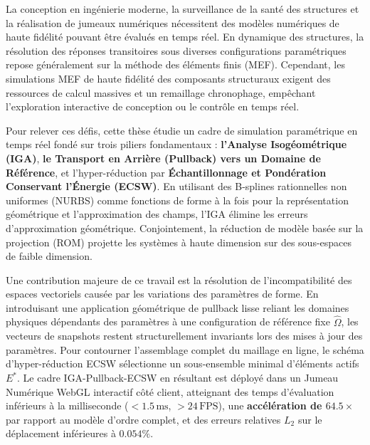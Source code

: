 La conception en ingénierie moderne, la surveillance de la santé des structures et la réalisation de jumeaux numériques nécessitent des modèles numériques de haute fidélité pouvant être évalués en temps réel. En dynamique des structures, la résolution des réponses transitoires sous diverses configurations paramétriques repose généralement sur la méthode des éléments finis (MEF). Cependant, les simulations MEF de haute fidélité des composants structuraux exigent des ressources de calcul massives et un remaillage chronophage, empêchant l'exploration interactive de conception ou le contrôle en temps réel.

Pour relever ces défis, cette thèse étudie un cadre de simulation paramétrique en temps réel fondé sur trois piliers fondamentaux : \textbf{l'Analyse Isogéométrique (IGA)}, \textbf{le Transport en Arrière (Pullback) vers un Domaine de Référence}, et l'hyper-réduction par \textbf{Échantillonnage et Pondération Conservant l'Énergie (ECSW)}. En utilisant des B-splines rationnelles non uniformes (NURBS) comme fonctions de forme à la fois pour la représentation géométrique et l'approximation des champs, l'IGA élimine les erreurs d'approximation géométrique. Conjointement, la réduction de modèle basée sur la projection (ROM) projette les systèmes à haute dimension sur des sous-espaces de faible dimension.

Une contribution majeure de ce travail est la résolution de l'incompatibilité des espaces vectoriels causée par les variations des paramètres de forme. En introduisant une application géométrique de pullback lisse reliant les domaines physiques dépendants des paramètres à une configuration de référence fixe $\hat{\Omega}$, les vecteurs de snapshots restent structurellement invariants lors des mises à jour des paramètres. Pour contourner l'assemblage complet du maillage en ligne, le schéma d'hyper-réduction ECSW sélectionne un sous-ensemble minimal d'éléments actifs $E^*$. Le cadre IGA-Pullback-ECSW en résultant est déployé dans un Jumeau Numérique WebGL interactif côté client, atteignant des temps d'évaluation inférieurs à la milliseconde ($<1.5\,\text{ms}$, $>24\,\text{FPS}$), une \textbf{accélération de $\mathbf{64.5\times}$} par rapport au modèle d'ordre complet, et des erreurs relatives $L_2$ sur le déplacement inférieures à $0.054\%$.
